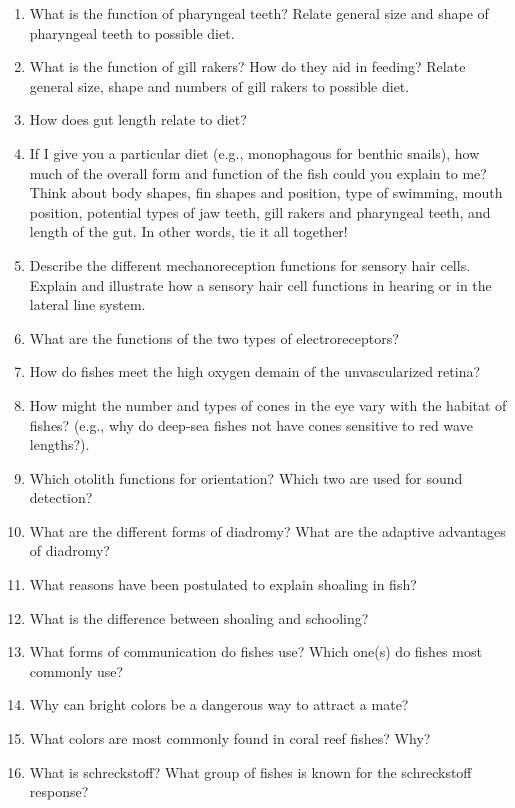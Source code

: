 \documentclass[nofonts, letterpaper]{tufte-handout}
\begin{document}
\begin{enumerate}
	\item What is the function of pharyngeal teeth?  Relate general size and shape of pharyngeal teeth to possible diet.

	\item What is the function of gill rakers?  How do they aid in feeding?  Relate general size, shape and numbers of gill rakers to possible diet.

	\item How does gut length relate to diet?

	\item If I give you a particular diet (e.g., monophagous for benthic snails), how much of the overall form and function of the fish could you explain to me?  Think about body shapes, fin shapes and position, type of swimming, mouth position, potential types of jaw teeth, gill rakers and pharyngeal teeth, and length of the gut.  In other words, tie it all together!

	\item Describe the different mechanoreception functions for sensory hair cells.  Explain and illustrate how a sensory hair cell functions in hearing or in the lateral line system.

	\item What are the functions of the two types of electroreceptors?

	\item How do fishes meet the high oxygen demain of the unvascularized retina?

	\item How might the number and types of cones in the eye vary with the habitat of fishes? (e.g., why do deep-sea fishes not have cones sensitive to red wave lengths?).

	\item Which otolith functions for orientation?  Which two are used for sound detection?

	\item What are the different forms of diadromy?  What are the adaptive advantages of diadromy?

	\item What reasons have been postulated to explain shoaling in fish?

	\item What is the difference between shoaling and schooling?

	\item What forms of communication do fishes use?  Which one(s) do fishes most commonly use?

	\item Why can bright colors be a dangerous way to attract a mate?

	\item What colors are most commonly found in coral reef fishes?  Why?

	\item What is schreckstoff?  What group of fishes is known for the schreckstoff response?

\end{enumerate}
\end{document}
